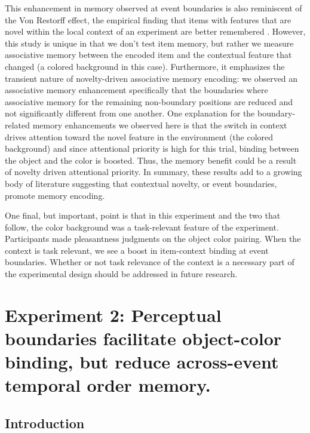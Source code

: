 This enhancement in memory observed at event boundaries is also
reminiscent of the Von Restorff effect, the empirical finding that items
with features that are novel within the local context of an experiment
are better remembered
\autocites{restorff_uber_1933}{ranganath_neural_2003}. However, this
study is unique in that we don't test item memory, but rather we measure
associative memory between the encoded item and the contextual feature
that changed (a colored background in this case). Furthermore, it
emphasizes the transient nature of novelty-driven associative memory
encoding: we observed an associative memory enhancement specifically
that the boundaries where associative memory for the remaining
non-boundary positions are reduced and not significantly different from
one another. One explanation for the boundary-related memory
enhancements we observed here is that the switch in context drives
attention toward the novel feature in the environment (the colored
background) and since attentional priority is high for this trial,
binding between the object and the color is boosted. Thus, the memory
benefit could be a result of novelty driven attentional priority. In
summary, these results add to a growing body of literature suggesting
that contextual novelty, or event boundaries, promote memory encoding.

One final, but important, point is that in this experiment and the two
that follow, the color background was a task-relevant feature of the
experiment. Participants made pleasantness judgments on the object color
pairing. When the context is task relevant, we see a boost in
item-context binding at event boundaries. Whether or not task relevance
of the context is a necessary part of the experimental design should be
addressed in future research.

\section{Experiment 2: Perceptual boundaries facilitate object-color
binding, but reduce across-event temporal order
memory.}\label{experiment-2-perceptual-boundaries-facilitate-object-color-binding-but-reduce-across-event-temporal-order-memory.}

\subsection{Introduction}\label{introduction-1}

